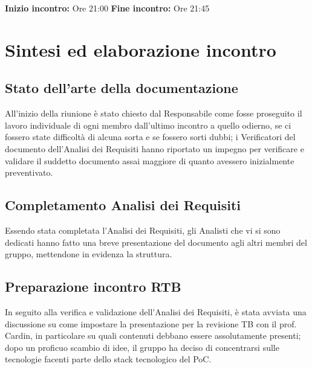 \documentclass[a4paper, 11pt]{article}
\begin{document}
\vspace{10pt}

\textbf{Inizio incontro:} Ore 21:00 \newline
\textbf{Fine incontro:} Ore 21:45  \newline

\pagebreak

\section{Sintesi ed elaborazione incontro}

\subsection{Stato dell'arte della documentazione}
All'inizio della riunione è stato chiesto dal Responsabile come fosse proseguito il lavoro 
individuale di ogni membro dall'ultimo incontro a quello odierno, se ci fossero state difficoltà di alcuna sorta e se fossero sorti dubbi; i Verificatori del documento dell'Analisi dei Requisiti hanno riportato un impegno per
verificare e validare il suddetto documento assai maggiore di quanto avessero inizialmente preventivato.

\subsection{Completamento Analisi dei Requisiti}
Essendo stata completata l'Analisi dei Requisiti, gli Analisti che vi si sono dedicati hanno fatto una breve presentazione del documento agli altri membri del
gruppo, mettendone in evidenza la struttura.

\subsection{Preparazione incontro RTB}
In seguito alla verifica e validazione dell'Analisi dei Requisiti, è stata avviata una discussione su come impostare la presentazione
per la revisione TB con il prof. Cardin, in particolare su quali contenuti debbano essere assolutamente presenti; dopo un proficuo scambio di idee,
il gruppo ha deciso di concentrarsi sulle tecnologie facenti parte dello stack tecnologico del PoC.
\end{document}
